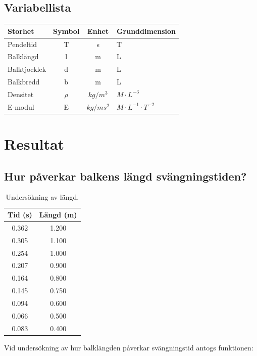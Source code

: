 \documentclass[10pt, titlepage, oneside, a4paper]{article}
\begin{document}
        \subsection{Variabellista}
        \begin{table}[h]
            \begin{tabular}{lccl}
            \hline
            \textbf{Storhet} & \textbf{Symbol} & \textbf{Enhet} & \textbf{Grunddimension} \\ \hline
            Pendeltid    & T    & s     & T          \\ 
            Balklängd    & l    & m     & L          \\ 
            Balktjocklek & d    & m     & L          \\ 
            Balkbredd    & b    & m     & L          \\ 
            Densitet     & $\rho$    & $kg/m^3$ & $M\cdot L^{-3}$     \\ 
            E-modul      & E      & \footnotesize $kg/ms^2$    &$M\cdot L^{-1}\cdot T^{-2}$                \\ \hline
            \end{tabular}
        \end{table} 
        
	\section{Resultat}
        \subsection{Hur påverkar balkens längd svängningstiden?}
        \begin{table}[H]
            \caption{Undersökning av längd.}
            \begin{center}
                \begin{tabular}{cc}
                    \hline
                    Tid (s) & Längd (m) \\
                    \hline
                    0.362 & 1.200 \\
                    0.305 & 1.100 \\
                    0.254 & 1.000 \\
                    0.207 & 0.900 \\
                    0.164 & 0.800 \\
                    0.145 & 0.750 \\
                    0.094 & 0.600 \\
                    0.066 & 0.500 \\
                    0.083 & 0.400 \\
                \end{tabular}
            \end{center}
        \end{table}
        Vid undersökning av hur balklängden påverkar svängningstid antogs funktionen:
\end{document}
